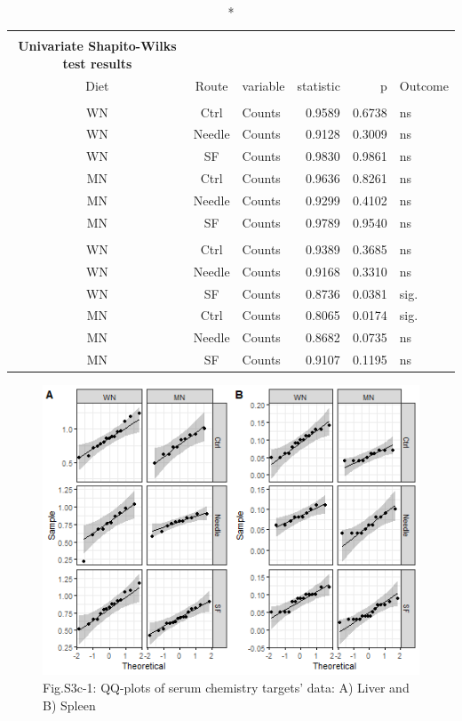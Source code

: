 \documentclass[
  12pt,
  letterpaper,
]{article}
\begin{document}
\begingroup
\fontsize{12.0pt}{14.4pt}\selectfont
\begin{longtable}{cclrrl}
\caption*{
{\large \textbf{Appendix Table 172}} \\ 
{\small \textbf{Univariate Shapito-Wilks test results}}
} \\ 
\toprule
{Diet} & {Route} & {variable} & {statistic} & {p} & {Outcome} \\ 
\midrule\addlinespace[2.5pt]
\multicolumn{6}{l}{Liver} \\[2.5pt] 
\midrule\addlinespace[2.5pt]
WN & Ctrl & Counts & 0.9589 & 0.6738 & ns \\ 
WN & Needle & Counts & 0.9128 & 0.3009 & ns \\ 
WN & SF & Counts & 0.9830 & 0.9861 & ns \\ 
MN & Ctrl & Counts & 0.9636 & 0.8261 & ns \\ 
MN & Needle & Counts & 0.9299 & 0.4102 & ns \\ 
MN & SF & Counts & 0.9789 & 0.9540 & ns \\ 
\midrule\addlinespace[2.5pt]
\multicolumn{6}{l}{Spleen} \\[2.5pt] 
\midrule\addlinespace[2.5pt]
WN & Ctrl & Counts & 0.9389 & 0.3685 & ns \\ 
WN & Needle & Counts & 0.9168 & 0.3310 & ns \\ 
WN & SF & Counts & 0.8736 & 0.0381 & sig. \\ 
MN & Ctrl & Counts & 0.8065 & 0.0174 & sig. \\ 
MN & Needle & Counts & 0.8682 & 0.0735 & ns \\ 
MN & SF & Counts & 0.9107 & 0.1195 & ns \\ 
\bottomrule
\end{longtable}
\endgroup

\begin{figure}[H]

{\centering \includegraphics[width=0.95\linewidth,]{Statistics_Report_files/figure-latex/qq-plot-figure-S3c-1} 

}

\caption{Fig.S3c-1: QQ-plots of serum chemistry targets' data: A) Liver and B) Spleen}\label{fig:qq-plot-figure-S3c}
\end{figure}
\end{document}
